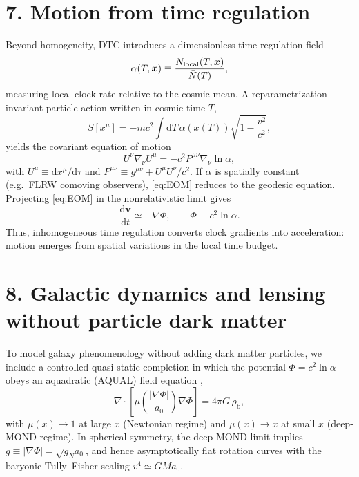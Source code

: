 \documentclass[12pt]{article}
\newcommand{\rhob}{\rho_{\mathrm{b}}}
\newcommand{\dd}{\mathrm{d}}
\newcommand{\alphaReg}{\alpha}
\begin{document}
\section*{7. Motion from time regulation}
Beyond homogeneity, DTC introduces a dimensionless time-regulation field
\begin{equation}
\alphaReg(T,\bm{x})\equiv \frac{N_{\rm local}(T,\bm{x})}{\bar N(T)},
\label{eq:alpha}
\end{equation}
measuring local clock rate relative to the cosmic mean. A reparametrization-invariant particle action written in cosmic time $T$,
\begin{equation}
S[x^{\mu}]= -mc^{2}\int \dd T\,\alphaReg\!\left(x(T)\right)\sqrt{1-\frac{v^{2}}{c^{2}}},
\label{eq:particle_action}
\end{equation}
yields the covariant equation of motion
\begin{equation}
U^{\nu}\nabla_{\nu}U^{\mu}=-c^{2}P^{\mu\nu}\nabla_{\nu}\ln\alphaReg,
\label{eq:EOM}
\end{equation}
with $U^{\mu}\equiv \dd x^{\mu}/\dd\tau$ and $P^{\mu\nu}\equiv g^{\mu\nu}+U^{\mu}U^{\nu}/c^{2}$. If $\alphaReg$ is spatially constant (e.g.\ FLRW comoving observers), \eqref{eq:EOM} reduces to the geodesic equation. Projecting \eqref{eq:EOM} in the nonrelativistic limit gives
\begin{equation}
\frac{\dd\bm{v}}{\dd t}\simeq -\nabla \Phi,
\qquad
\Phi\equiv c^{2}\ln\alphaReg.
\label{eq:Phi_eff}
\end{equation}
Thus, inhomogeneous time regulation converts clock gradients into acceleration: motion emerges from spatial variations in the local time budget.

\section*{8. Galactic dynamics and lensing without particle dark matter}
To model galaxy phenomenology without adding dark matter particles, we include a controlled quasi-static completion in which the potential $\Phi=c^{2}\ln\alphaReg$ obeys an aquadratic (AQUAL) field equation \citep{Milgrom1983,BekensteinMilgrom1984},
\begin{equation}
\nabla\!\cdot\!\left[\mu\!\left(\frac{|\nabla\Phi|}{a_{0}}\right)\nabla\Phi\right]=4\pi G\,\rhob,
\label{eq:AQUAL}
\end{equation}
with $\mu(x)\rightarrow 1$ at large $x$ (Newtonian regime) and $\mu(x)\rightarrow x$ at small $x$ (deep-MOND regime). In spherical symmetry, the deep-MOND limit implies $g\equiv |\nabla\Phi|=\sqrt{g_{N}a_{0}}$, and hence asymptotically flat rotation curves with the baryonic Tully--Fisher scaling $v^{4}\simeq GMa_{0}$.
\end{document}
